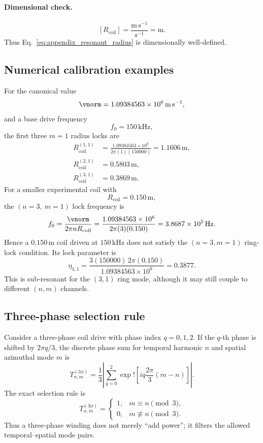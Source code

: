 \paragraph{Dimensional check.}
\[
[R_{\mathrm{coil}}]
=
\frac{\mathrm{m\,s^{-1}}}{\mathrm{s^{-1}}}
=
\mathrm{m}.
\]
Thus Eq.~\eqref{eq:appendix_resonant_radius} is dimensionally well-defined.

\subsection{Numerical calibration examples}

For the canonical value
\[
\vnorm = 1.09384563\times10^6\,\mathrm{m\,s^{-1}},
\]
and a base drive frequency
\[
f_0 = 150\,\mathrm{kHz},
\]
the first three $m=1$ radius locks are
\begin{align}
R_{\mathrm{coil}}^{(1,1)}
&=
\frac{1.09384563\times10^6}{2\pi(1)(150000)}
=
1.1606\,\mathrm{m},
\\
R_{\mathrm{coil}}^{(2,1)}
&=
0.5803\,\mathrm{m},
\\
R_{\mathrm{coil}}^{(3,1)}
&=
0.3869\,\mathrm{m}.
\end{align}
For a smaller experimental coil with
\[
R_{\mathrm{coil}}=0.150\,\mathrm{m},
\]
the $(n=3,\ m=1)$ lock frequency is
\begin{equation}
f_0
=
\frac{\vnorm}{2\pi n R_{\mathrm{coil}}}
=
\frac{1.09384563\times10^6}
{2\pi(3)(0.150)}
=
3.8687\times10^5\,\mathrm{Hz}.
\end{equation}
Hence a $0.150\,\mathrm{m}$ coil driven at $150\,\mathrm{kHz}$ does not satisfy the $(n=3,m=1)$ ring-lock condition. Its lock parameter is
\begin{equation}
\eta_{3,1}
=
\frac{3(150000)\,2\pi(0.150)}
{1.09384563\times10^6}
=
0.3877.
\end{equation}
This is sub-resonant for the $(3,1)$ ring mode, although it may still couple to different $(n,m)$ channels.

\subsection{Three-phase selection rule}

Consider a three-phase coil drive with phase index $q=0,1,2$. If the $q$-th phase is shifted by $2\pi q/3$, the discrete phase sum for temporal harmonic $n$ and spatial azimuthal mode $m$ is
\begin{equation}
T_{n,m}^{(3\phi)}
=
\frac{1}{3}
\left|
\sum_{q=0}^{2}
\exp!\left[
i q \frac{2\pi}{3}(m-n)
\right]
\right|.
\label{eq:appendix_three_phase_factor}
\end{equation}
The exact selection rule is
\begin{equation}
\boxed{
T_{n,m}^{(3\phi)}
=
\begin{cases}
1, & m\equiv n \pmod{3},\\
0, & m\not\equiv n \pmod{3}.
\end{cases}
}
\label{eq:appendix_three_phase_rule}
\end{equation}
Thus a three-phase winding does not merely ``add power''; it filters the allowed temporal--spatial mode pairs.

